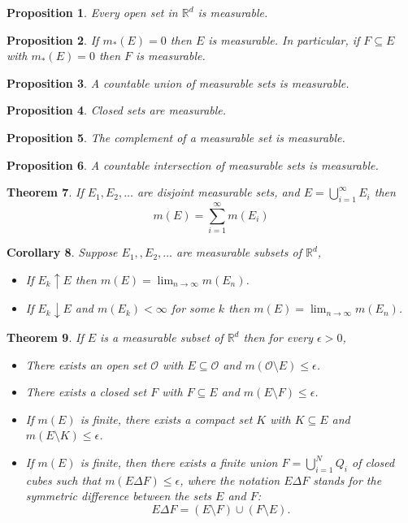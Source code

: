 \documentclass[11pt, letter]{book}
\newtheorem{theorem}{Theorem}[section]
\newtheorem{corollary}[theorem]{Corollary}
\newtheorem{proposition}[theorem]{Proposition}
\newcommand\R{\mathbb{R}}
\begin{document}
\begin{proposition}
Every open set in $\R^d$ is measurable. 
\end{proposition}
\begin{proposition}
If $m_*(E) = 0$ then $E$ is measurable. In particular, if $F\subseteq E$ with $m_*(E)=  0$ then $F$ is measurable. 
\end{proposition}
\begin{proposition}
A countable union of measurable sets is measurable. 
\end{proposition}
\begin{proposition}
Closed sets are measurable. 
\end{proposition}
\begin{proposition}
The complement of a measurable set is measurable.
\end{proposition}
\begin{proposition}
A countable intersection of measurable sets is measurable.
\end{proposition}
\begin{theorem}
If $E_1, E_2, \dots$ are disjoint measurable sets, and $E = \bigcup^\infty_{i=1}E_i$ then 
\begin{equation*}
    m(E) = \sum^\infty_{i=1}m(E_i)
\end{equation*}
\end{theorem}
\begin{corollary}
Suppose $E_1,, E_2, \dots$ are measurable subsets of $\mathbb{R}^d$, 
\begin{itemize}
    \item If $E_k \uparrow E$ then $m(E) = \lim_{n\to \infty}m(E_n)$.
    \item If $E_k \downarrow E$ and $m(E_k) < \infty$ for some $k$ then $m(E) = \lim_{n\to \infty} m(E_n)$.
\end{itemize}
\end{corollary}
\begin{theorem}
If  $E$ is a measurable subset of $\R^d$ then for every $\epsilon > 0$, 
\begin{itemize}
    \item There exists an open set $\mathcal{O}$ with $E \subseteq \mathcal{O}$ and $m(\mathcal{O}\setminus E) \leq \epsilon$.
    \item There exists a closed set $F$ with $F \subseteq E$ and $m(E\setminus F) \leq \epsilon$.
    \item If $m(E)$ is finite, there exists a compact set $K$ with $K \subseteq E$ and $m(E\setminus K) \leq \epsilon$.
    \item If $m(E)$ is finite, then there exists a finite union $F = \bigcup^N_{i=1}Q_i$ of closed cubes such that $m(E\Delta F) \leq \epsilon$, where the notation $E\Delta F$ stands for the symmetric difference between the sets $E$ and $F$:
    \begin{equation*}
        E \Delta F = (E\setminus F) \cup (F \setminus E).
    \end{equation*}
\end{itemize}
\end{theorem}
\end{document}
